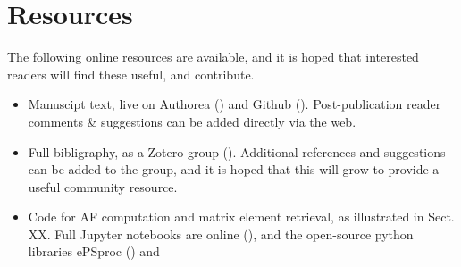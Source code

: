\section{Resources}

The following online resources are available, and it is hoped that interested readers will find these useful, and contribute.

\begin{itemize}
\item Manuscipt text, live on Authorea () and Github (). Post-publication reader comments \& suggestions can be added directly via the web.
\item Full bibligraphy, as a Zotero group (). Additional references and suggestions can be added to the group, and it is hoped that this will grow to provide a useful community resource.
\item Code for AF computation and matrix element retrieval, as illustrated in Sect. XX. Full Jupyter notebooks are online (), and the open-source python libraries ePSproc () and 
\end{itemize}